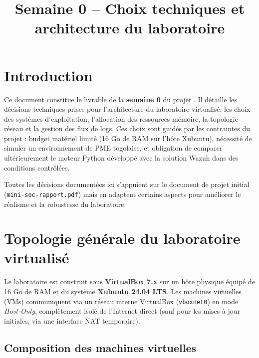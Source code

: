 \documentclass[12pt,a4paper]{article}
\title{\textbf{Semaine 0 – Choix techniques et architecture du laboratoire}}
\begin{document}
\maketitle
\tableofcontents
\newpage

\section{Introduction}

Ce document constitue le livrable de la \textbf{semaine 0} du projet . Il détaille les décisions techniques prises pour l'architecture du laboratoire virtualisé, les choix des systèmes d'exploitation, l'allocation des ressources mémoire, la topologie réseau et la gestion des flux de logs. Ces choix sont guidés par les contraintes du projet : budget matériel limité (16 Go de RAM sur l'hôte Xubuntu), nécessité de simuler un environnement de PME togolaise, et obligation de comparer ultérieurement le moteur Python développé avec la solution Wazuh dans des conditions contrôlées.

Toutes les décisions documentées ici s'appuient sur le document de projet initial (\texttt{mini-soc-rapport.pdf}) mais en adaptent certains aspects pour améliorer le réalisme et la robustesse du laboratoire.

\section{Topologie générale du laboratoire virtualisé}

Le laboratoire est construit sous \textbf{VirtualBox 7.x} sur un hôte physique équipé de 16 Go de RAM et du système \textbf{Xubuntu 24.04 LTS}. Les machines virtuelles (VMs) communiquent via un réseau interne VirtualBox (\texttt{vboxnet0}) en mode \textit{Host-Only}, complètement isolé de l'Internet direct (sauf pour les mises à jour initiales, via une interface NAT temporaire).

\subsection{Composition des machines virtuelles}
\end{document}
